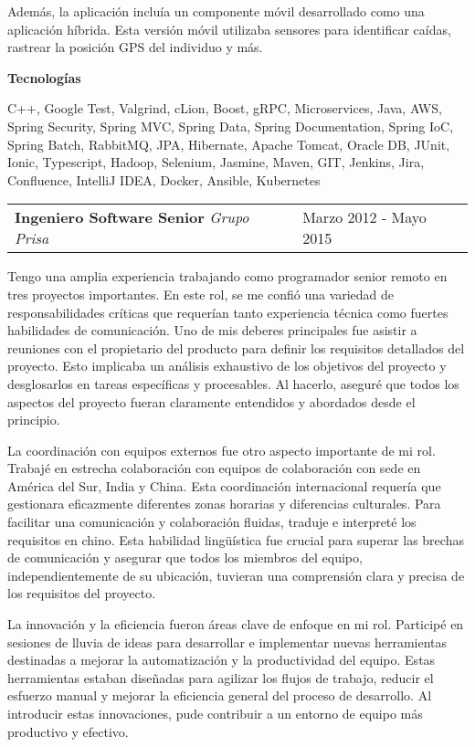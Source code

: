 \documentclass[a4paper,10pt]{article}
\makeatletter
\newcommand{\cvsubsection}[3]{
  \begin{tcolorbox}[colback=gray!20, colframe=gray!20, boxrule=0pt, arc=0mm, outer arc=0mm, width=\dimexpr\textwidth-2mm\relax, boxsep=0pt, left=2mm, right=2mm, top=2mm, bottom=2mm]
    \begin{tabular*}{\dimexpr\textwidth-6mm\relax}{p{0.7\textwidth} @{\extracolsep{\fill}} p{0.3\textwidth}}
      \raggedright
      \textbf{#1} \textit{#2} & \raggedleft \small{#3}
    \end{tabular*}
  \end{tcolorbox}
  \vspace{2mm}
}
\newcommand{\cvsubsubsubsection}[1]{
  \begin{tcolorbox}[colback=gray!5, colframe=gray!5, boxrule=0pt, arc=0mm, outer arc=0mm, width=\textwidth, boxsep=0pt, left=6mm, right=6mm, top=1mm, bottom=1mm]
    \textbf{#1}
  \end{tcolorbox}
  \vspace{1mm}
}
\makeatother
\begin{document}
Además, la aplicación incluía un componente móvil desarrollado como una aplicación híbrida. Esta versión móvil utilizaba sensores para identificar caídas, rastrear la posición GPS del individuo y más.

\cvsubsubsubsection{Tecnologías}
C++, Google Test, Valgrind, cLion, Boost, gRPC, Microservices, Java, AWS, Spring Security, Spring MVC, Spring Data, Spring Documentation, Spring IoC, Spring Batch, RabbitMQ, JPA, Hibernate, Apache Tomcat, Oracle DB, JUnit, Ionic, Typescript, Hadoop, Selenium, Jasmine, Maven, GIT, Jenkins, Jira, Confluence, IntelliJ IDEA, Docker, Ansible, Kubernetes

\cvsubsection{Ingeniero Software Senior}{Grupo Prisa}{Marzo 2012 - Mayo 2015}
Tengo una amplia experiencia trabajando como programador senior remoto en tres proyectos importantes. En este rol, se me confió una variedad de responsabilidades críticas que requerían tanto experiencia técnica como fuertes habilidades de comunicación. Uno de mis deberes principales fue asistir a reuniones con el propietario del producto para definir los requisitos detallados del proyecto. Esto implicaba un análisis exhaustivo de los objetivos del proyecto y desglosarlos en tareas específicas y procesables. Al hacerlo, aseguré que todos los aspectos del proyecto fueran claramente entendidos y abordados desde el principio.

La coordinación con equipos externos fue otro aspecto importante de mi rol. Trabajé en estrecha colaboración con equipos de colaboración con sede en América del Sur, India y China. Esta coordinación internacional requería que gestionara eficazmente diferentes zonas horarias y diferencias culturales. Para facilitar una comunicación y colaboración fluidas, traduje e interpreté los requisitos en chino. Esta habilidad lingüística fue crucial para superar las brechas de comunicación y asegurar que todos los miembros del equipo, independientemente de su ubicación, tuvieran una comprensión clara y precisa de los requisitos del proyecto.

La innovación y la eficiencia fueron áreas clave de enfoque en mi rol. Participé en sesiones de lluvia de ideas para desarrollar e implementar nuevas herramientas destinadas a mejorar la automatización y la productividad del equipo. Estas herramientas estaban diseñadas para agilizar los flujos de trabajo, reducir el esfuerzo manual y mejorar la eficiencia general del proceso de desarrollo. Al introducir estas innovaciones, pude contribuir a un entorno de equipo más productivo y efectivo.
\end{document}
